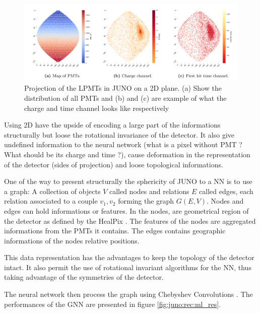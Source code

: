 \documentclass[../main.tex]{subfiles}
\begin{document}
\begin{figure}[ht]
  \centering
  \includegraphics[width=\linewidth]{images/juno/reco/cnn_proj.png}
  \caption{Projection of the LPMTs in JUNO on a 2D plane. (a) Show the distribution of all PMTs and (b) and (c) are example of what the charge and time channel looks like respectively}
  \label{fig:juno:rec:cnn_proj}
\end{figure}

Using 2D have the upside of encoding a large part of the informations structurally but loose the rotational invariance of the detector. It also give undefined information to the neural network (what is a pixel without PMT ? What should be its charge and time ?), cause deformation in the representation of the detector (sides of projection) and loose topological informations.

One of the way to present structurally the sphericity of JUNO to a NN is to use a graph: A collection of objects $V$ called nodes and relations $E$ called edges, each relation associated to a couple ${v_1, v_2}$ forming the graph $G(E, V)$. Nodes and edges can hold informations or features. In \cite{qian_vertex_2021} the nodes, are geometrical region of the detector as defined by the HealPix \cite{gorski_healpix_2005-1}. The features of the nodes are aggregated informations from the PMTs it contains. The edges contains geographic informations of the nodes relative positions.

This data representation has the advantages to keep the topology of the detector intact. It also permit the use of rotational invariant algorithms for the NN, thus taking advantage of the symmetries of the detector.

The neural network then process the graph using Chebyshev Convolutions \cite{defferrard_convolutional_2017}. The performances of the GNN are presented in figure \ref{fig:juno:rec:ml_res}.
\end{document}
